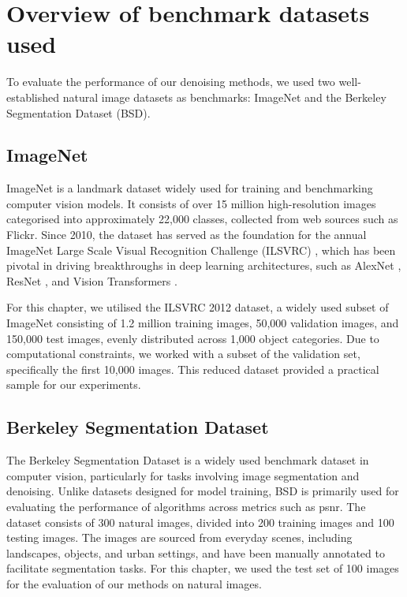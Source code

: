 \section{Overview of benchmark datasets used}\label{sec:denoising-datasets}

To evaluate the performance of our denoising methods, we used two well-established natural image datasets as benchmarks: ImageNet and the Berkeley Segmentation Dataset (BSD). 

\subsection{ImageNet}

ImageNet \cite{deng_imagenet_2009} is a landmark dataset widely used for training and benchmarking computer vision models. It consists of over 15 million high-resolution images categorised into approximately 22,000 classes, collected from web sources such as Flickr. Since 2010, the dataset has served as the foundation for the annual ImageNet Large Scale Visual Recognition Challenge (ILSVRC) \cite{russakovsky_imagenet_2015}, which has been pivotal in driving breakthroughs in deep learning architectures, such as AlexNet \cite{krizhevsky_imagenet_2012}, ResNet \cite{he_deep_2015}, and Vision Transformers \cite{dosovitskiy_image_2020}.

For this chapter, we utilised the ILSVRC 2012 dataset, a widely used subset of ImageNet consisting of 1.2 million training images, 50,000 validation images, and 150,000 test images, evenly distributed across 1,000 object categories. Due to computational constraints, we worked with a subset of the validation set, specifically the first 10,000 images. This reduced dataset provided a practical sample for our experiments.

\subsection{Berkeley Segmentation Dataset}

The Berkeley Segmentation Dataset \cite{martin_database_2001} is a widely used benchmark dataset in computer vision, particularly for tasks involving image segmentation and denoising. Unlike datasets designed for model training, BSD is primarily used for evaluating the performance of algorithms across metrics such as \acrshort{psnr}. The dataset consists of 300 natural images, divided into 200 training images and 100 testing images. The images are sourced from everyday scenes, including landscapes, objects, and urban settings, and have been manually annotated to facilitate segmentation tasks. For this chapter, we used the test set of 100 images for the evaluation of our methods on natural images.

